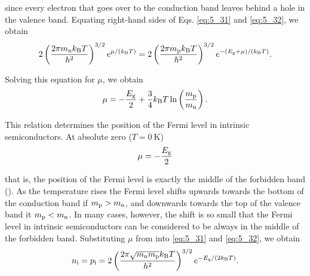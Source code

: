 \noindent
since every electron that goes over to the conduction band leaves behind a hole in the valence band. Equating right-hand sides of Eqs. \eqref{eq:5_31} and \eqref{eq:5_32}, we obtain
\begin{equation*}
    2 \left(\frac{2 \pi m_{\text{n}} k_{\text{B}}T}{h^2}\right)^{3/2} e^{\mu/(k_{\text{B}}T)} = 2 \left(\frac{2 \pi m_{\text{p}} k_{\text{B}}T}{h^2}\right)^{3/2} e^{-(E_{\text{g}}+\mu)/(k_{\text{B}}T)}.
\end{equation*}

\noindent
Solving this equation for $\mu$, we obtain
\begin{equation}\label{eq:5_35}
    \mu = - \frac{E_{\text{g}}}{2} + \frac{3}{4} k_{\text{B}} T \ln\left(\frac{m_{\text{p}}}{m_{\text{n}}}\right).
\end{equation}

This relation determines the position of the Fermi level in intrinsic semiconductors. At absolute zero ($T=\SI{0}{\kelvin}$)
\begin{equation}\label{eq:5_36}
    \mu = - \frac{E_{\text{g}}}{2}
\end{equation}

\noindent
that is, the position of the Fermi level is exactly the middle of the forbidden band (). As the temperature rises the Fermi level shifts upwards towards the bottom of the conduction band if $m_{\text{p}}>m_{\text{n}}$, and downwards towards the top of the valence band it $m_{\text{p}}<m_{\text{n}}$. In many cases, however, the shift is so small that the Fermi level in intrinsic semiconductors can be considered to be always in the middle of the forbidden band. Substituting $\mu$ from  into \eqref{eq:5_31} and \eqref{eq:5_32}, we obtain
\begin{equation}\label{eq:5_37}
    n_{\text{i}} = p_{\text{i}} = 2 \left(\frac{2 \pi \sqrt{m_{\text{n}} m_{\text{p}}} k_{\text{B}} T}{h^2}\right)^{3/2} e^{-E_{\text{g}}/(2k_{\text{B}}T)}.
\end{equation}

